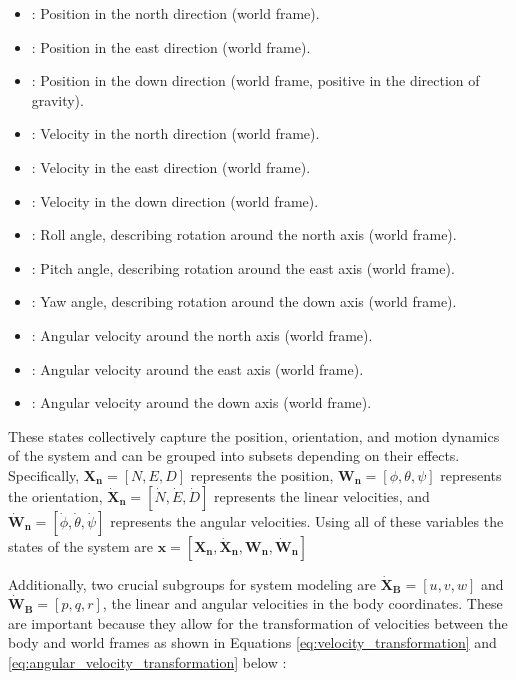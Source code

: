 \documentclass{UoNMCHA}
\numberwithin{equation}{section}
\begin{document}
\begin{itemize}
    \item {}: Position in the north direction (world frame).
    \item {}: Position in the east direction (world frame).
    \item {}: Position in the down direction (world frame, positive in the direction of gravity).
    \item {}: Velocity in the north direction (world frame).
    \item {}: Velocity in the east direction (world frame).
    \item {}: Velocity in the down direction (world frame).
    \item \text{\(\phi\)}: Roll angle, describing rotation around the north axis (world frame).
    \item \text{\(\theta\)}: Pitch angle, describing rotation around the east axis (world frame).
    \item \text{\(\psi\)}: Yaw angle, describing rotation around the down axis (world frame).
    \item \text{\(\dot{\phi}\)}: Angular velocity around the north axis (world frame).
    \item \text{\(\dot{\theta}\)}: Angular velocity around the east axis (world frame).
    \item \text{\(\dot{\psi}\)}: Angular velocity around the down axis (world frame).
\end{itemize}

These states collectively capture the position, orientation, and motion dynamics of the system and can be grouped into subsets depending on their effects. Specifically, \(\mathbf{X_n} = [N, E, D]\) represents the position, \(\mathbf{W_n} = [\phi, \theta, \psi]\) represents the orientation, \(\mathbf{\dot{X}_n} = [\dot{N}, \dot{E}, \dot{D}]\) represents the linear velocities, and \(\mathbf{\dot{W}_n} = [\dot{\phi}, \dot{\theta}, \dot{\psi}]\) represents the angular velocities. Using all of these variables the states of the system are \(\mathbf{x} = [\mathbf{X_n}, \mathbf{\dot{X}_n}, \mathbf{W_n}, \mathbf{\dot{W}_n}]\)

Additionally, two crucial subgroups for system modeling are \(\mathbf{\dot{X}_B} = [u, v, w]\) and \(\mathbf{\dot{W}_B} = [p, q, r]\), the linear and angular velocities in the body coordinates. These are important because they allow for the transformation of velocities between the body and world frames as shown in Equations \ref{eq:velocity_transformation} and \ref{eq:angular_velocity_transformation} below \cite{HindawiDynamcis}:
\end{document}
